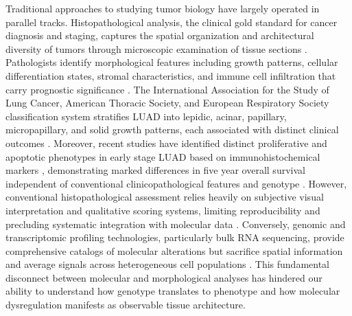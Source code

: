 \documentclass[pdflatex,article,12pt]{article}
\begin{document}
Traditional approaches to studying tumor biology have largely operated in parallel tracks. Histopathological analysis, the clinical gold standard for cancer diagnosis and staging, captures the spatial organization and architectural diversity of tumors through microscopic examination of tissue sections \cite{ehteshami2017diagnostic}. Pathologists identify morphological features including growth patterns, cellular differentiation states, stromal characteristics, and immune cell infiltration that carry prognostic significance \cite{tsao2016tumor,hwang2021molecular}. The International Association for the Study of Lung Cancer, American Thoracic Society, and European Respiratory Society classification system stratifies LUAD into lepidic, acinar, papillary, micropapillary, and solid growth patterns, each associated with distinct clinical outcomes \cite{travis2011international,chen2024spatial}. Moreover, recent studies have identified distinct proliferative and apoptotic phenotypes in early stage LUAD based on immunohistochemical markers \cite{zeng2025identification}, demonstrating marked differences in five year overall survival independent of conventional clinicopathological features and genotype \cite{michalarea2022prognostic}. However, conventional histopathological assessment relies heavily on subjective visual interpretation and qualitative scoring systems, limiting reproducibility and precluding systematic integration with molecular data \cite{komura2024machine,lee2023recent}. Conversely, genomic and transcriptomic profiling technologies, particularly bulk RNA sequencing, provide comprehensive catalogs of molecular alterations but sacrifice spatial information and average signals across heterogeneous cell populations \cite{raksik2024multiomics,cancer2014comprehensive}. This fundamental disconnect between molecular and morphological analyses has hindered our ability to understand how genotype translates to phenotype and how molecular dysregulation manifests as observable tissue architecture.
\end{document}
